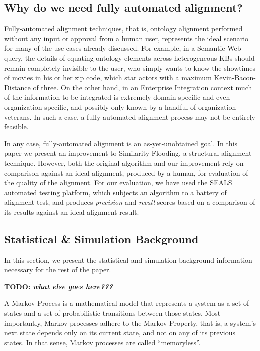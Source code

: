 \documentclass[letterpaper,twocolumn,12pt]{article}
\begin{document}
\subsection{Why do we need fully automated alignment?}
\label{subsec:automated}
Fully-automated alignment techniques, that is, ontology alignment performed without
any input or approval from a human user, represents the ideal scenario for many
of the use cases already discussed. For example, in a Semantic Web query, the details
of equating ontology elements across heterogeneous KBs should remain completely
invisible to the user, who simply wants to know the showtimes of movies in his or her
zip code, which star actors with a maximum Kevin-Bacon-Distance of three.
On the other hand, in an Enterprise Integration context much of the information to
be integrated is extremely domain specific and even organization specific, and possibly
only known by a handful of organization veterans. In such a case, a fully-automated
alignment process may not be entirely feasible.

In any case, fully-automated alignment is an as-yet-unobtained goal. In this paper
we present an improvement to Similarity Flooding, a structural alignment technique. However,
both the original algorithm and our improvement rely on comparison against an ideal
alignment, produced by a human, for evaluation of the quality of the alignment. For our
evaluation, we have used the SEALS automated testing platform, which subjects an algorithm
to a battery of alignment test, and produces \textit{precision} and \textit{recall} scores
based on a comparison of its results against an ideal alignment result.


\subsection{Statistical \& Simulation Background}
\label{subsec:stat}
In this section, we present the statistical and simulation background information
necessary for the rest of the paper.

\textbf{TODO: \textit{what else goes here???}}

A Markov Process is a mathematical model that represents a system as a set of states
and a set of probabilistic transitions between those states. Most importantly, Markov 
processes adhere to the Markov Property, that is, a system's next state depends only
on its current state, and not on any of its previous states. In that sense, Markov
processes are called ``memoryless''.
\end{document}

